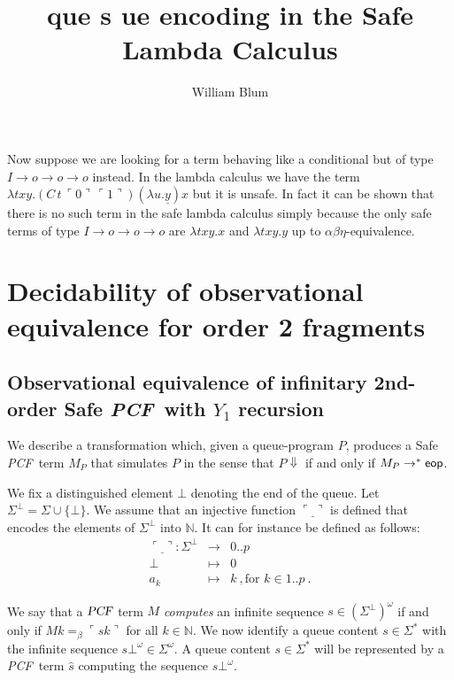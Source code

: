 \documentclass{article}
\author{William Blum}
\title{que s ue encoding in the Safe Lambda Calculus}
\newcommand{\encode}[1]{\ulcorner #1 \urcorner}
\newcommand{\nat}{\mathbb{N}}
\newcommand\eop{{\sf eop}}
\newcommand\pcf{\textsl{PCF}}
\begin{document}
\maketitle
Now suppose we are looking for a term behaving like a conditional but of type $I\rightarrow o\rightarrow o \rightarrow o$ instead. In the lambda calculus we have the term $\lambda t x y . (C\,t\,\encode{0}\, \encode{1}) (\lambda u . \underline{y}) x$ but it is unsafe. In fact it can be shown that there is no such term in the safe lambda calculus simply because the only safe terms of type $I\rightarrow o\rightarrow o \rightarrow o$  are $\lambda t x y . x$  and $\lambda t x y . y$ up to $\alpha\beta\eta$-equivalence.
  


\section{Decidability of observational equivalence for order 2 fragments}



\subsection{Observational equivalence of infinitary 2nd-order Safe \pcf\ with $Y_1$ recursion}

We describe a transformation which, given a queue-program $P$, produces a Safe \pcf\ term $M_P$ that simulates $P$ in the sense that $P \Downarrow$ if and only if $M_P \rightarrow^* \eop$.

We fix a distinguished element $\bot$ denoting the end of the queue. Let $\Sigma^\bot = \Sigma \cup \{ \bot \}$. We assume that an injective function $\encode{\underline{\ }}$ is defined that encodes  the
elements of $\Sigma^\bot$ into $\nat$. It can for instance be defined as follows:
\begin{eqnarray*}
\encode{\underline{\ }} : \Sigma^\bot &\longrightarrow& 0..p \\
 \bot &\mapsto& 0 \\
 a_k &\mapsto& k \ , \mbox{for } k \in 1..p \ .
\end{eqnarray*}

We say that a $\pcf$ term $M$ \emph{computes} an infinite sequence $s \in {(\Sigma^\bot)}^\omega$ if and only if $M k =_\beta \encode{s k}$ for all $k\in \nat$. We now identify a queue content $s \in \Sigma^*$ with the infinite sequence $s \bot^\omega \in \Sigma^\omega$. A queue content $s \in \Sigma^*$ will be represented by a \pcf\ term $\hat{s}$ computing the sequence $s \bot^\omega$.
\end{document}

